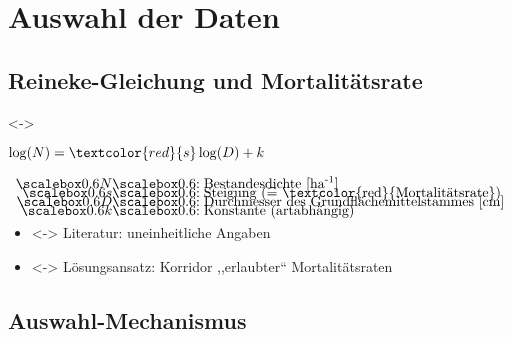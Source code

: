 \section{Auswahl der Daten}
\subsection{Reineke-Gleichung und Mortalitätsrate}
\begin{frame}[c]
  \visible<\thefirstElement->{
    \centerline{
      \(\log(N) = \textcolor{red}{s} \log(D) + k\)
    }
    
    \begin{minipage}{1.0\textwidth}
      \centerline{
      }
    \end{minipage}
    \begin{align*}
      \myscalebox{N} & \myscalebox{: \text{Bestandesdichte [ha\textsuperscript{-1}]}} \\[-3mm]
      \myscalebox{s} & \myscalebox{: \text{Steigung (}\widehat{=}\text{ \textcolor{red}{Mortalitätsrate})}} \\[-3mm]
      \myscalebox{D} & \myscalebox{: \text{Durchmesser des Grundflächemittelstammes [cm]}} \\[-3mm]
      \myscalebox{k} & \myscalebox{: \text{Konstante (artabhängig)}} \\[-3mm]
    \end{align*}}
  
  \begin{itemize}
  \item<\thesecondElement-> Literatur: uneinheitliche Angaben
  \item<\thesecondElement-> Lösungsansatz: Korridor ,,erlaubter`` Mortalitätsraten
  \end{itemize}
  
\end{frame}

\subsection{Auswahl-Mechanismus}

